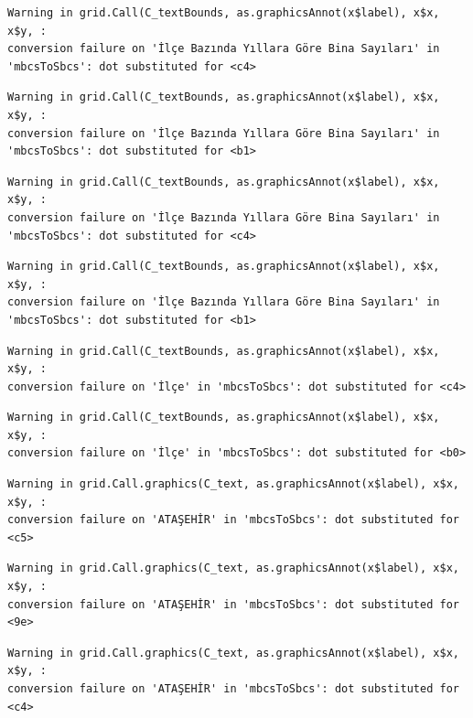 \documentclass[
  11pt,
  a4paper,
  DIV=11,
  numbers=noendperiod]{scrartcl}
\begin{document}
\begin{verbatim}
Warning in grid.Call(C_textBounds, as.graphicsAnnot(x$label), x$x, x$y, :
conversion failure on 'İlçe Bazında Yıllara Göre Bina Sayıları' in
'mbcsToSbcs': dot substituted for <c4>
\end{verbatim}

\begin{verbatim}
Warning in grid.Call(C_textBounds, as.graphicsAnnot(x$label), x$x, x$y, :
conversion failure on 'İlçe Bazında Yıllara Göre Bina Sayıları' in
'mbcsToSbcs': dot substituted for <b1>
\end{verbatim}

\begin{verbatim}
Warning in grid.Call(C_textBounds, as.graphicsAnnot(x$label), x$x, x$y, :
conversion failure on 'İlçe Bazında Yıllara Göre Bina Sayıları' in
'mbcsToSbcs': dot substituted for <c4>
\end{verbatim}

\begin{verbatim}
Warning in grid.Call(C_textBounds, as.graphicsAnnot(x$label), x$x, x$y, :
conversion failure on 'İlçe Bazında Yıllara Göre Bina Sayıları' in
'mbcsToSbcs': dot substituted for <b1>
\end{verbatim}

\begin{verbatim}
Warning in grid.Call(C_textBounds, as.graphicsAnnot(x$label), x$x, x$y, :
conversion failure on 'İlçe' in 'mbcsToSbcs': dot substituted for <c4>
\end{verbatim}

\begin{verbatim}
Warning in grid.Call(C_textBounds, as.graphicsAnnot(x$label), x$x, x$y, :
conversion failure on 'İlçe' in 'mbcsToSbcs': dot substituted for <b0>
\end{verbatim}

\begin{verbatim}
Warning in grid.Call.graphics(C_text, as.graphicsAnnot(x$label), x$x, x$y, :
conversion failure on 'ATAŞEHİR' in 'mbcsToSbcs': dot substituted for <c5>
\end{verbatim}

\begin{verbatim}
Warning in grid.Call.graphics(C_text, as.graphicsAnnot(x$label), x$x, x$y, :
conversion failure on 'ATAŞEHİR' in 'mbcsToSbcs': dot substituted for <9e>
\end{verbatim}

\begin{verbatim}
Warning in grid.Call.graphics(C_text, as.graphicsAnnot(x$label), x$x, x$y, :
conversion failure on 'ATAŞEHİR' in 'mbcsToSbcs': dot substituted for <c4>
\end{verbatim}
\end{document}
